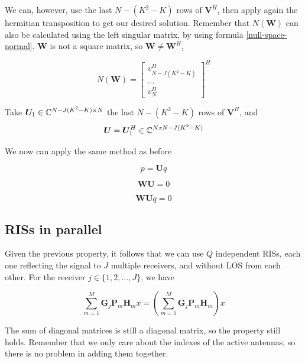 We can, however, use the last $N - (K^2 - K)$ rows of $\bm{V}^H$, then apply again the hermitian transposition to get our desired solution. Remember that $N(\bm{W})$ can also be calculated using the left singular matrix, by using formula \eqref{null-space-normal}. $\bm{W}$ is not a square matrix, so $\bm{W} \ne \bm{W}^H$,

\begin{equation}
  N(\bm{W}) = \begin{bmatrix} v^H_{N - J(K^2 - K)} \\ ... \\ v^H_N \end{bmatrix} ^ H
\end{equation}

Take $\bm{U}_1 \in \mathbb{C} ^ {N - J(K^2 - K) \times N}$ the last $N - (K^2 - K)$ rows of $\bm{V}^H$, and
\begin{equation}
  \bm{U} = \bm{U}_1^H \in \mathbb{C} ^ {N x N - J(K^2 - K)}
\end{equation}

We now can apply the same method as before

\begin{equation}p = \bm{U}q\end{equation}

\begin{equation}\bm{WU} = 0\end{equation}

\begin{equation}\bm{WU}q = 0\end{equation}

\newpage
\subsection{RISs in parallel}

Given the previous property, it follows that we can use $Q$ independent RISs, each one reflecting the signal to $J$ multiple receivers, and without LOS from each other. For the receiver $j \in \{1, 2, \ldots , J\}$, we have

\begin{equation}
  \sum_{m=1}^M \bm{G}_j \bm{P}_m \bm{H}_m x = (\sum_{m=1}^M \bm{G}_j \bm{P}_m \bm{H}_m) x
\end{equation}

The sum of diagonal matrices is still a diagonal matrix, so the property still holds. Remember that we only care about the indexes of the active antennas, so there is no problem in adding them together.

